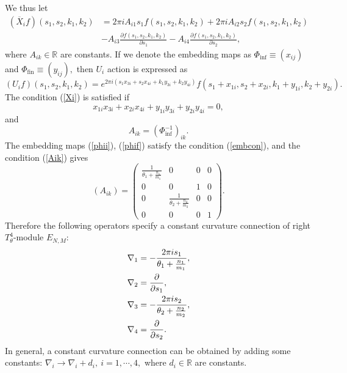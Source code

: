 \documentclass[12pt, a4paper]{article}
\newcommand{\R}{{\mathbb R}}
\begin{document}
We thus let
\begin{align*}
(\overline{X}_i f)(s_1,s_2,k_1,k_2)&=2\pi
iA_{i1}s_1f(s_1,s_2,k_1,k_2)+2\pi
iA_{i2}s_2f(s_1,s_2,k_1,k_2)\\
&-A_{i3}\frac{\partial f(s_1,s_2,k_1,k_2)}{\partial s_1}-
A_{i4}\frac{\partial f(s_1,s_2,k_1,k_2)}{\partial s_2},
\end{align*}
where $A_{ik} \in \R$ are constants. If we denote the embedding
maps as $\Phi_{\text{inf}} \equiv (x_{ij})$ and $\Phi_{\text{fin}}
\equiv (y_{ij}),$ then $U_i$ action is expressed  as
\begin{equation*}
(U_i f)(s_1,s_2,k_1,k_2) = e^{2 \pi i ( s_1 x_{3i}
+ s_2 x_{4i} + k_1 y_{3i} + k_2 y_{4i} )} f ( s_1 +x_{1i},s_2
+x_{2i},k_1 +y_{1i},k_2 +y_{2i}) .
\end{equation*}
The condition (\ref{Xi}) is satisfied if
\begin{equation} \label{embcon}
x_{1i}x_{3i}+ x_{2i}x_{4i} + y_{1i}y_{3i} +y_{2i}y_{4i} =0 ,
\end{equation}
 and
\begin{equation} \label{Aik}
A_{ik} =(\Phi_{\text{inf}}^{-1})_{ik} .
\end{equation}
 The embedding maps  (\ref{phii}), (\ref{phif}) satisfy
the condition (\ref{embcon}), and the condition (\ref{Aik}) gives
\[ ( A_{ik}) =\begin{pmatrix} \frac{1}{\theta_1 + \frac{n_1}{m_1}}&0&0&0\\
                0&0&1&0\\
               0&  \frac{1}{\theta_2 + \frac{n_2}{m_2}}&0&0\\
                0&0& 0&1 \end{pmatrix} . \]
Therefore the following operators specify a constant curvature
connection of right $ T_\theta^4$-module $E_{N,M}$:
\begin{align} \label{connection}
\nabla_1 & = - \frac{2 \pi i s_1 }{\theta_1 + \frac{n_1}{m_1}} ,
\notag \\
\nabla_2 & =  \frac{\partial}{\partial s_1} , \notag \\
\nabla_3 & = - \frac{2 \pi i s_2 }{\theta_2 + \frac{n_2}{m_2}} ,
\notag \\
\nabla_4 & =  \frac{\partial}{\partial s_2} .
\end{align}
In general, a constant curvature connection can be obtained by
adding some constants: \( \nabla_i \rightarrow \nabla_i + d_i , \
i=1,\cdots,4, \) where $ d_i  \in \R $ are constants.
\end{document}
